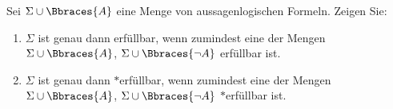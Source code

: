 
\begin{exercise}[25]

Sei $\Sigma \cup \Bbraces{A}$ eine Menge von aussagenlogischen Formeln.
Zeigen Sie:

\begin{enumerate}
    \item $\Sigma$ ist genau dann erfüllbar, wenn zumindest eine der Mengen $\Sigma \cup \Bbraces{A}$, $\Sigma \cup \Bbraces{\neg A}$ erfüllbar ist.
    \item $\Sigma$ ist genau dann $\ast$erfüllbar, wenn zumindest eine der Mengen $\Sigma \cup \Bbraces{A}$, $\Sigma \cup \Bbraces{\neg A}$ $\ast$erfüllbar ist.
\end{enumerate}

\end{exercise}



